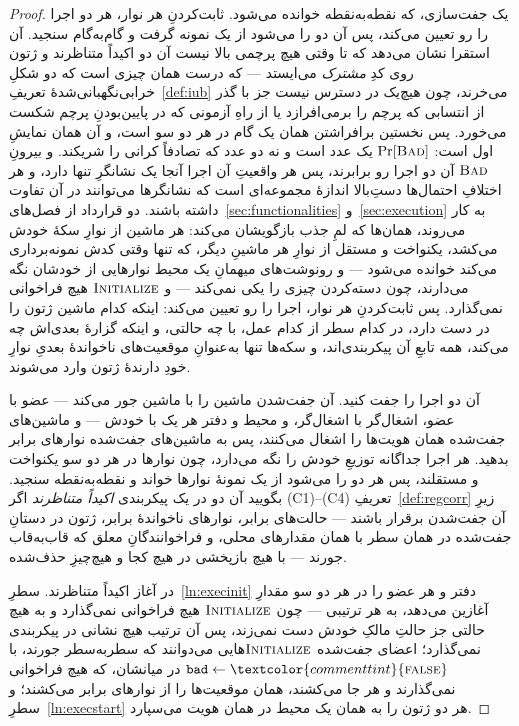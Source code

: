 \documentclass[10pt,oneside,openany]{book}
\newcommand{\op}[1]{\textnormal{\textsc{#1}}}
\newcommand{\atom}[1]{\textcolor{commenttint}{\op{#1}}}
\newcommand{\false}{\atom{false}}
\newcommand{\Bad}{\op{Bad}}
\newcommand{\V}[1]{\mathtt{#1}}
\theoremstyle{accentdef}
\theoremstyle{accentplain}
\begin{document}
\begin{proof}
یک جفت‌سازی، که نقطه‌به‌نقطه خوانده می‌شود. ثابت‌کردنِ هر نوار، هر دو اجرا
را رو تعیین می‌کند، پس آن دو را می‌شود از یک نمونه گرفت و گام‌به‌گام سنجید.
آن استقرا نشان می‌دهد که تا وقتی هیچ پرچمی بالا نیست آن دو اکیداً متناظرند و
ژتون روی کدِ \emph{مشترک} می‌ایستد --- که درست همان چیزی است که دو شکلِ
خرابی‌نگهبانی‌شدهٔ تعریفِ~\ref{def:iub} می‌خرند، چون هیچ‌یک در دسترس نیست جز
با گذر از انتسابی که پرچم را برمی‌افرازد یا از راهِ آزمونی که در پایین‌بودنِ
پرچم شکست می‌خورد. پس نخستین برافراشتن همان یک گام در هر دو سو است، و آن
همان نمایشِ اول است: $\Pr[\Bad]$ یک عدد است و نه دو عدد که تصادفاً کرانی را
شریکند. و بیرونِ $\Bad$ آن دو اجرا رو برابرند، پس هر واقعیتِ آن اجرا آنجا
یک نشانگرِ تنها دارد، و هر اختلافِ احتمال‌ها دستِ‌بالا اندازهٔ مجموعه‌ای است
که نشانگرها می‌توانند در آن تفاوت داشته باشند.
دو قرارداد از فصل‌های~\ref{sec:functionalities} و~\ref{sec:execution} به کار
می‌روند، همان‌ها که لمِ جذب بازگویشان می‌کند: هر ماشین از نوارِ سکهٔ خودش
می‌کشد، یکنواخت و مستقل از نوارِ هر ماشینِ دیگر، که تنها وقتی کدش
نمونه‌برداری می‌کند خوانده می‌شود --- و رونوشت‌های میهمانِ یک محیط نوارهایی
از خودشان نگه می‌دارند، چون دسته‌کردن چیزی را یکی نمی‌کند --- و
$\op{Initialize}$ هیچ فراخوانی نمی‌گذارد. پس ثابت‌کردنِ هر نوار، اجرا را رو
تعیین می‌کند: اینکه کدام ماشین ژتون را در دست دارد، در کدام سطر از کدام عمل،
با چه حالتی، و اینکه گزارهٔ بعدی‌اش چه می‌کند، همه تابعِ آن پیکربندی‌اند، و
سکه‌ها تنها به‌عنوانِ موقعیت‌های ناخواندهٔ بعدیِ نوارِ خودِ دارندهٔ ژتون وارد
می‌شوند.

آن دو اجرا را جفت کنید. آن جفت‌شدن ماشین را با ماشین جور می‌کند --- عضو با
عضو، اشغال‌گر با اشغال‌گر، و محیط و دفتر هر یک با خودش --- و ماشین‌های
جفت‌شده همان هویت‌ها را اشغال می‌کنند، پس به ماشین‌های جفت‌شده نوارهای برابر
بدهید. هر اجرا جداگانه توزیعِ خودش را نگه می‌دارد، چون نوارها در هر دو سو
یکنواخت و مستقلند، پس هر دو را می‌شود از یک نمونهٔ نوارها خواند و
نقطه‌به‌نقطه سنجید. بگویید آن دو در یک پیکربندی \emph{اکیداً متناظرند} اگر
(C1)--(C4)ِ تعریفِ~\ref{def:regcorr} زیرِ آن جفت‌شدن برقرار باشند ---
حالت‌های برابر، نوارهای ناخواندهٔ برابر، ژتون در دستانِ جفت‌شده در همان سطر
با همان مقدارهای محلی، و فراخوانندگانِ معلق که قاب‌به‌قاب جورند --- با هیچ
بازپخشی در هیچ کجا و هیچ‌چیزِ حذف‌شده.

در آغاز اکیداً متناظرند. سطرِ~\ref{ln:execinit} دفتر و هر عضو را در هر دو
سو مقدارِ آغازین می‌دهد، به هر ترتیبی --- چون $\op{Initialize}$ هیچ
فراخوانی نمی‌گذارد و به هیچ حالتی جز حالتِ مالکِ خودش دست نمی‌زند، پس آن
ترتیب هیچ نشانی در پیکربندی نمی‌گذارد؛ اعضای جفت‌شده
$\op{Initialize}$هایی می‌دوانند که سطر‌به‌سطر جورند، با $\V{bad} \gets
\false$ در میانشان، که هیچ فراخوانی نمی‌گذارند و هر جا می‌کشند، همان
موقعیت‌ها را از نوارهای برابر می‌کشند؛ و سطرِ~\ref{ln:execstart} هر دو
ژتون را به همان یک محیط در همان هویت می‌سپارد.


\end{proof}
\end{document}
